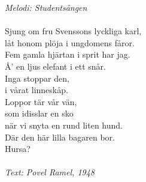 {\footnotesize\textit{Melodi: Studentsången}}\\
\\
Sjung om fru Svenssons lyckliga karl,\\
låt honom plöja i ungdomens fåror.\\
Fem gamla hjärtan i sprit har jag.\\
Å’ en ljus elefant i ett snår.\\
Inga stoppar den,\\
i vårat linneskåp.\\
Loppor tär vår vän,\\
som idisslar en sko\\
när vi snyta en rund liten hund.\\
\revrpt Där den här lilla bagaren bor.\rpt\\
Hursa?\\
\\
{\footnotesize\textit{Text: Povel Ramel, 1948}}
